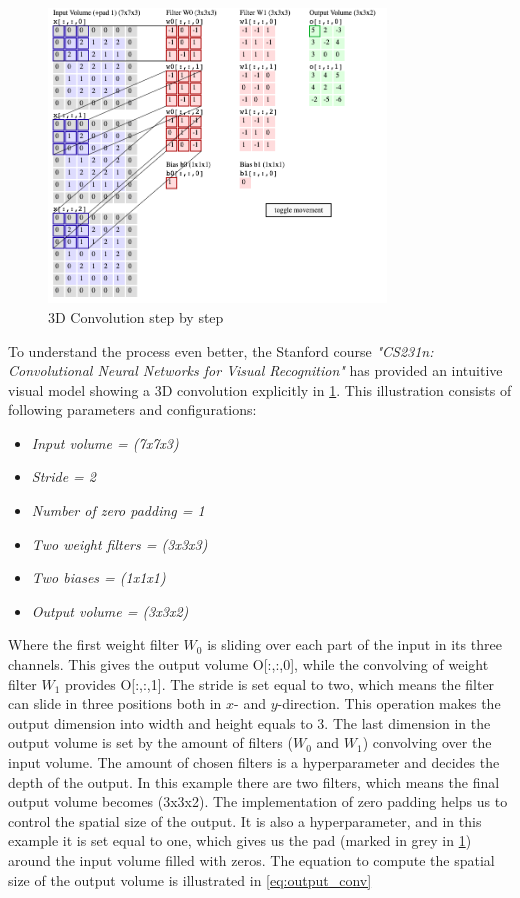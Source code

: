 \documentclass[USenglish]{ifimaster}  %
\begin{document}
\begin{figure}[H]
    \centering
    \includegraphics[width=0.8\textwidth]{bilder/conv2.png}
    \caption{3D Convolution step by step \cite{website:cs231n}}
    \label{fig:conv}
\end{figure}
To understand the process even better, the Stanford course \textit{"CS231n: Convolutional Neural Networks for Visual Recognition"} has provided an intuitive visual model showing a 3D convolution explicitly in \cref{fig:conv}. This illustration consists of following parameters and configurations:

\begin{itemize}
    \item \textit{Input volume = (7x7x3)}
    \item \textit{Stride = 2}
    \item \textit{Number of zero padding = 1}
    \item \textit{Two weight filters = (3x3x3)}
    \item \textit{Two biases = (1x1x1)}
    \item \textit{Output volume = (3x3x2)}
\end{itemize}
Where the first weight filter $W_0$ is sliding over each part of the input in its three channels. This gives the output volume O[:,:,0], while the convolving of weight filter $W_1$ provides O[:,:,1]. The stride is set equal to two, which means the filter can slide in three positions both in $x$- and $y$-direction. This operation makes the output dimension into width and height equals to 3. The last dimension in the output volume is set by the amount of filters ($W_0$ and $W_1$) convolving over the input volume. The amount of chosen filters is a hyperparameter and decides the depth of the output. In this example there are two filters, which means the final output volume becomes (3x3x2). 
The implementation of zero padding helps us to control the spatial size of the output. It is also a hyperparameter, and in this example it is set equal to one, which gives us the pad (marked in grey in \cref{fig:conv}) around the input volume filled with zeros. 
\newline
\newline
The equation to compute the spatial size of the output volume is illustrated in \cref{eq:output_conv}
\end{document}
